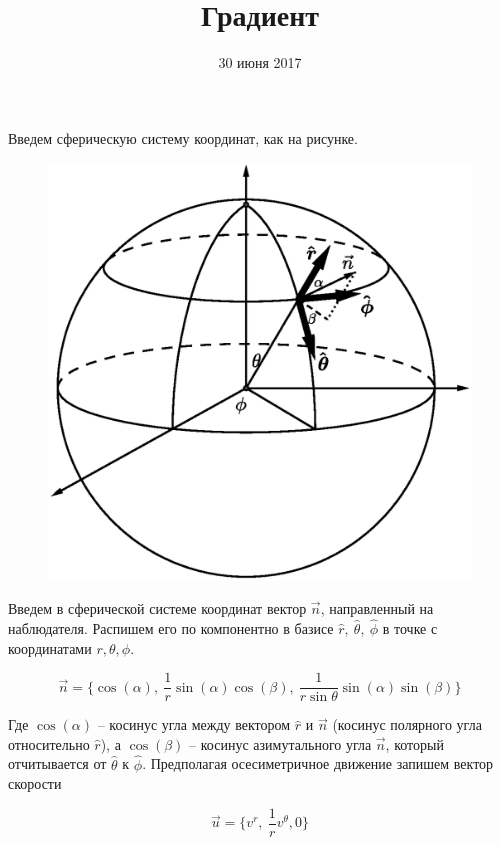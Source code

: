 \documentclass{article}
\begin{document}
\title{Градиент}
\author{   }
\date{30 июня 2017}
\maketitle

Введем сферическую систему координат, как на рисунке.

\begin{figure} [h]
    \centering
    \includegraphics[scale=0.7]{Sphere2.eps}
\end{figure}

Введем в сферической системе координат вектор $\vec{n}$, направленный на наблюдателя. Распишем его по компонентно в базисе $\hat{r}, \ \hat{\theta}, \ \hat{\phi}$ в точке с координатами $r, \theta, \phi$. 

\[
\vec{n} = \lbrace \cos(\alpha), \ \frac{1}{r}\sin(\alpha)\cos(\beta), \ \frac{1}{r\sin\theta}\sin(\alpha)\sin(\beta)\rbrace
\]

Где $\cos(\alpha)$ -- косинус угла между вектором $\hat{r}$ и $\vec{n}$ (косинус полярного угла относительно $\hat{r}$), а $\cos(\beta)$ -- косинус азимутального угла $\vec{n}$, который отчитывается от $\hat{\theta}$ к $\hat{\phi}$. 
Предполагая осесиметричное движение запишем вектор скорости

\[
\vec{u} = \lbrace v^{r},\ \frac{1}{r} v^{\theta}, 0\rbrace
\]
\end{document}
